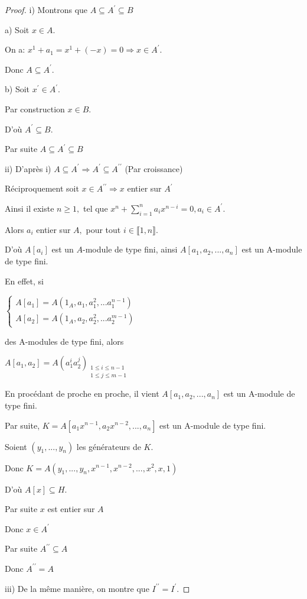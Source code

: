\begin{proof}
	i) Montrons que $A\subseteq A^{\prime }\subseteq B$
	
	a) Soit $x\in A.$
	
	On a: $x^{1}+a_{1}=x^{1}+(-x)=0\Rightarrow x\in A^{\prime }.$
	
	Donc $A\subseteq A^{\prime }.$
	
	b) Soit $x^{\prime }\in A^{\prime }.$ 
	
	Par construction $x\in B.$
	
	D'où $A^{\prime }\subseteq B.$
	
	Par suite $A \subseteq A^{\prime }\subseteq B$
	
	
	
	ii) D'après i) $A\subseteq A^{\prime }\Rightarrow A^{\prime }\subseteq
	A^{\prime \prime }$ (Par croissance)
	
	Réciproquement soit $x\in A^{\prime \prime }\Rightarrow x$ entier sur $
	A^{\prime }$
	
	Ainsi il existe $n\geq 1,$ tel que  $x^{n}+\sum
	\limits_{i=1}^{n}a_{i}x^{n-i}=0,a_{i}\in A^{\prime }.$
	
	Alors $a_{i}$ entier sur $A,$ pour tout $i\in \llbracket 1, n \rrbracket.$
	
	D'où $A[a_{i}]$ est un $A$-module de type fini, ainsi $
	A[a_{1},a_{2},...,a_{n}]$ est un A-module de type fini.
	
	En effet, si
	
	$\left\{ 
	\begin{array}{c}
		A[a_{1}]=A(1_{A},a_{1},a_{1}^{2},...a_{1}^{n-1}) \\ 
		A[a_{2}]=A(1_{A},a_{2},a_{2}^{2},...a_{2}^{m-1})
	\end{array}
	\right. $
	
	des A-modules de type fini, alors 
	
	$A[a_{1},a_{2}]=A(a_{1}^{i}a_{2}^{j})_{\substack{ 1\leq i\leq n-1 \\ 1\leq
			j\leq m-1}}$
	
	En procédant de proche en proche, il vient $A[a_{1},a_{2},...,a_{n}]$
	est un A-module de type fini.
	
	Par suite, $K=A[a_{1}x^{n-1},a_{2}x^{n-2},...,a_{n}]$ est un A-module de
	type fini.
	
	Soient $(y_{1},...,y_{n})$ les générateurs de $K.$
	
	Donc $K=A(y_{1},...,y_{n},x^{n-1},x^{n-2},...,x^{2},x,1)$
	
	D'où $A[x]\subseteq H.$
	
	Par suite $x$ est entier sur $A$
	
	Donc $x\in A^{\prime }$
	
	Par suite $A^{\prime \prime }\subseteq A$
	
	Donc  $A^{\prime \prime }=A$
	
	iii) De la même manière, on montre que $I^{\prime \prime }=I^{\prime
	}.$
\end{proof}
